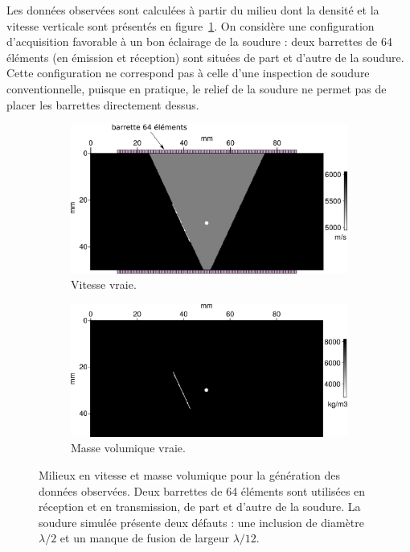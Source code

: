 Les données observées sont calculées à partir du milieu dont la densité et  la vitesse verticale sont présentés en figure~\ref{app:iso:model}. On considère une configuration d'acquisition favorable à un bon éclairage de la soudure : deux barrettes de 64 éléments (en émission et réception) sont situées de part et d'autre de la soudure. Cette configuration ne correspond pas à celle d'une inspection de soudure conventionnelle, puisque en pratique, le relief de la soudure ne permet pas de placer les barrettes directement dessus.\\

\begin{figure}[!h]
	\centering
	\begin{subfigure}[b]{0.45\textwidth}
		\includegraphics[width=\textwidth]{img/milieux_ps/vp_true.png}
		\caption{Vitesse vraie.}
	\end{subfigure}
	\begin{subfigure}[b]{0.45\textwidth}
		\includegraphics[width=\textwidth]{img/milieux_ps/rho_true.png}
		\caption{Masse volumique vraie.}
	\end{subfigure}
	\caption{Milieux en vitesse et masse volumique pour la génération des données observées. Deux barrettes de 64 éléments sont utilisées en réception et en transmission, de part et d'autre de la soudure. La soudure simulée présente deux défauts : une inclusion de diamètre $\lambda/2$ et un manque de fusion de largeur $\lambda/12$.\label{app:iso:model}}
\end{figure}

